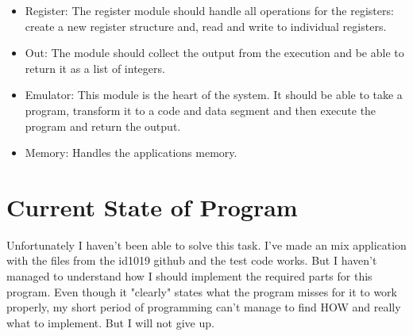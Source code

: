 \documentclass[a4paper,11pt]{article}
\begin{document}
\begin{itemize}
\item Register: The register module should handle all operations for the
		  registers: create a new register structure and, read and write to individual registers.
\end{itemize}


\begin{itemize}
\item Out: The module should collect the output from the execution and
		  be able to return it as a list of integers.
\end{itemize}


\begin{itemize}
\item Emulator: This module is the heart of the system. It should be able
          to take a program, transform it to a code and data segment and then
          execute the program and return the output.
\end{itemize}


\begin{itemize}
\item Memory: Handles the applications memory.
\end{itemize}

\section{Current State of Program}

Unfortunately I haven't been able to solve this task. I've made an mix application with the files from the id1019 github and the test code works. But I haven't managed to understand how I should implement the required parts for this program. Even though it "clearly" states what the program misses for it to work properly, my short period of programming can't manage to find HOW and really what to implement. But I will not give up.
\end{document}

